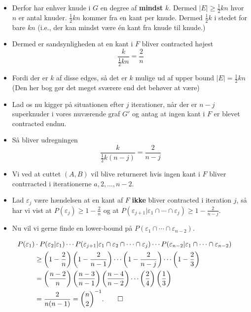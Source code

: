 \documentclass{beamer}
\begin{document}
\begin{frame}[allowframebreaks]
\begin{itemize}
 \item Derfor har enhver knude i $G$ en degree af \textbf{mindst} $k$. Dermed $|E| \geq \frac{1}{2}kn$ hvor $n$ er antal knuder. $\frac{1}{2}kn$ kommer fra en kant per knude. Dermed $\frac{1}{2}k$ i stedet for bare $kn$  (i.e., der kan mindst være én kant fra knude til knude.)
 \item Dermed er sandsynligheden at en kant i $F$ bliver contracted højest \[ \frac{k}{\frac{1}{2}kn} = \frac{2}{n}  \]
 \item Fordi der er $k$ af disse edges, så det er $k$ mulige ud af upper bound $|E| = \frac{1}{2}kn$ (Den her bog gør det meget sværere end det behøver at være)
 \item Lad os nu kigger på situationen efter $j$ iterationer, når der er $n-j$ superknuder i vores nuværende graf $G'$ og antag at ingen kant i $F$ er blevet contracted endnu.
 \item Så bliver udregningen \[ \frac{k}{\frac{1}{2}k(n-j)} = \frac{2}{n-j} \]
 \item Vi ved at cuttet $(A,B)$ vil blive returneret hvis ingen kant i $F$ bliver contrracted i iterationerne $a,2, \ldots, n-2$. 
 \item Lad $\varepsilon_{j}$ være hændelsen at en kant af $F$ \textbf{ikke} bliver contracted  i iteration $j$, så har vi vist at $P(\varepsilon_{j}) \geq 1 - \frac{2}{n}$ og at $P(\varepsilon_{j+1} | \varepsilon_{1} \cap \cdots \cap \varepsilon_{j}) \geq 1 - \frac{2}{n-j}$.
 \item Nu vil vi gerne finde en lower-bound på $P(\varepsilon_{1} \cap \cdots \cap \varepsilon_{n-2})$.
 \end{itemize}

 \begin{equation}
\begin{split}
  P(\varepsilon_{1}) &\cdot P(\varepsilon_{2}| \varepsilon_{1}) \cdots P(\varepsilon_{j+1} | \varepsilon_{1} \cap \varepsilon_{2} \cap \cdots \cap \varepsilon_{j}) \cdots P(\varepsilon_{n-2} | \varepsilon_{1} \cap \cdots \cap \varepsilon_{n-2})\\
           &\geq \left( 1- \frac{2}{n} \right) \left( 1-\frac{2}{n-1} \right) \cdots \left( 1 - \frac{2}{n-j} \right) \cdots \left( 1 - \frac{2}{3} \right)\\
           &= \left( \frac{n-2}{n} \right) \left(  \frac{n-3}{n-1} \right) \left( \frac{n-4}{n-2} \right) \cdots \left( \frac{2}{4} \right) \left( \frac{1}{3} \right)\\
  &= \frac{2}{n(n-1)} = \binom{n}{2}^{-1}. \qed
\end{split}
 \end{equation}


\end{frame}
\end{document}
